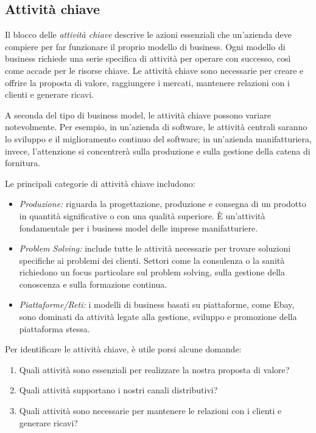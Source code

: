 \subsection*{Attività chiave}
Il blocco delle \textit{attività chiave} descrive le azioni essenziali che un’azienda deve compiere per far funzionare il proprio modello di business. Ogni modello di business richiede una serie specifica di attività per operare con successo, così come accade per le risorse chiave. Le attività chiave sono necessarie per creare e offrire la proposta di valore, raggiungere i mercati, mantenere relazioni con i clienti e generare ricavi.

A seconda del tipo di business model, le attività chiave possono variare notevolmente. Per esempio, in un’azienda di software, le attività centrali saranno lo sviluppo e il miglioramento continuo del software; in un’azienda manifatturiera, invece, l’attenzione si concentrerà sulla produzione e sulla gestione della catena di fornitura.

Le principali categorie di attività chiave includono:
\begin{itemize}
    \item \textit{Produzione:} riguarda la progettazione, produzione e consegna di un prodotto in quantità significative o con una qualità superiore. È un’attività fondamentale per i business model delle imprese manifatturiere.
    \item \textit{Problem Solving:} include tutte le attività necessarie per trovare soluzioni specifiche ai problemi dei clienti. Settori come la consulenza o la sanità richiedono un focus particolare sul problem solving, sulla gestione della conoscenza e sulla formazione continua.
    \item \textit{Piattaforme/Reti:} i modelli di business basati su piattaforme, come Ebay, sono dominati da attività legate alla gestione, sviluppo e promozione della piattaforma stessa.
\end{itemize}
Per identificare le attività chiave, è utile porsi alcune domande:
\begin{enumerate}
    \item Quali attività sono essenziali per realizzare la nostra proposta di valore?
    \item Quali attività supportano i nostri canali distributivi?
    \item Quali attività sono necessarie per mantenere le relazioni con i clienti e generare ricavi?
\end{enumerate}

